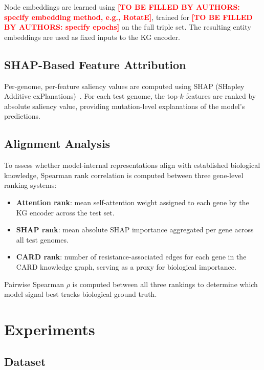 \documentclass[conference]{IEEEtran}
\newcommand{\tbd}[1]{\textcolor{red}{\textbf{[TO BE FILLED BY AUTHORS: #1]}}}
\begin{document}
Node embeddings are learned using \tbd{specify embedding method, e.g., RotatE}, trained for \tbd{specify epochs} on the full triple set. The resulting entity embeddings are used as fixed inputs to the KG encoder.

\subsection{SHAP-Based Feature Attribution}

Per-genome, per-feature saliency values are computed using SHAP (SHapley Additive exPlanations)~\cite{ref_shap}. For each test genome, the top-$k$ features are ranked by absolute saliency value, providing mutation-level explanations of the model's predictions.

\subsection{Alignment Analysis}

To assess whether model-internal representations align with established biological knowledge, Spearman rank correlation is computed between three gene-level ranking systems:

\begin{itemize}
    \item \textbf{Attention rank}: mean self-attention weight assigned to each gene by the KG encoder across the test set.
    \item \textbf{SHAP rank}: mean absolute SHAP importance aggregated per gene across all test genomes.
    \item \textbf{CARD rank}: number of resistance-associated edges for each gene in the CARD knowledge graph, serving as a proxy for biological importance.
\end{itemize}

Pairwise Spearman $\rho$ is computed between all three rankings to determine which model signal best tracks biological ground truth.

\section{Experiments}

\subsection{Dataset}
\end{document}
